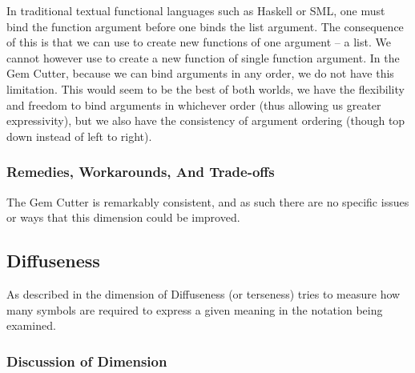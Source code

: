 In traditional textual functional languages such as Haskell or SML, one must bind the function argument before one binds the list argument.  The consequence of this is that we can use  to create new functions of one argument -- a list.  We cannot however use  to create a new function of single function argument.  In the Gem Cutter, because we can bind arguments in any order, we do not have this limitation.  This would seem to be the best of both worlds, we have the flexibility and freedom to bind arguments in whichever order (thus allowing us greater expressivity), but we also have the consistency of argument ordering (though top down instead of left to right).

\subsubsection{Remedies, Workarounds, And Trade-offs}

The Gem Cutter is remarkably consistent, and as such there are no specific issues or ways that this dimension could be improved.


\subsection{Diffuseness}
\label{sec:eval:diffuseness}

As described in  the dimension of Diffuseness (or terseness) tries to measure how many symbols are required to express a given meaning in the notation being examined.

\subsubsection{Discussion of Dimension}

